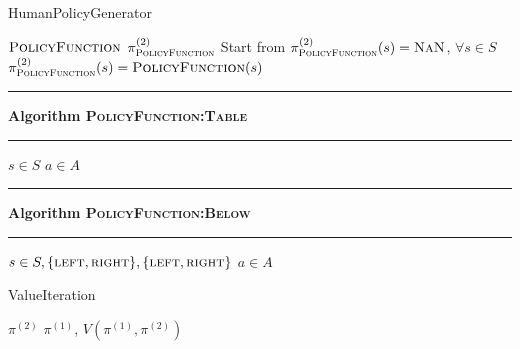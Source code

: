 \documentclass{article}
\theoremstyle{definition}
\newcommand\Algphase[1]{%
	\vspace*{-.7\baselineskip}\Statex\hspace*{\dimexpr-\algorithmicindent-2pt\relax}\rule{\textwidth}{0.4pt}%
	\Statex\hspace*{-\algorithmicindent}\textbf{#1}%
	\vspace*{-.7\baselineskip}\Statex\hspace*{\dimexpr-\algorithmicindent-2pt\relax}\rule{\textwidth}{0.4pt}%
}
\begin{document}
    \begin{algorithm}
        \caption{HumanPolicyGenerator}
        \label{algo:human_policy_generator}
        \begin{algorithmic}[1]
            \Require $ \textsc{PolicyFunction} $
            \Ensure $ \pi^{(2)}_{\textsc{PolicyFunction}} $ 
            \State Start from $ \pi^{(2)}_{\textsc{PolicyFunction}} (s)= \textsc{NaN}  $, $\forall s\in S$
                \State  $ \pi^{(2)}_{\textsc{PolicyFunction}} (s)=  \textsc{PolicyFunction}(s) $    
            \EndFor
        \end{algorithmic}	

        \begin{algorithmic}[1]
            \Algphase{Algorithm \normalfont\textsc{PolicyFunction:Table}}
            \Require $ s \in S $  
            \Ensure $ a \in A $ 
        \end{algorithmic}

        \begin{algorithmic}[1]
            \Algphase{Algorithm \normalfont\textsc{PolicyFunction:Below}}
            \Require $ s \in S, \{\textsc{left},\textsc{right}\},  \{\textsc{left},\textsc{right}\}$  
            \Ensure $ a \in A $ 
        \end{algorithmic}

    \end{algorithm}

    \begin{algorithm}
        \caption{ValueIteration}
        \label{algo:vi}
        \begin{algorithmic}[1]
            \Require $ \pi^{(2)} $
            \Ensure $ \pi^{(1)}$, $ V(\pi^{(1)},\pi^{(2)} ) $  
        \end{algorithmic}	
    \end{algorithm}
\end{document}
